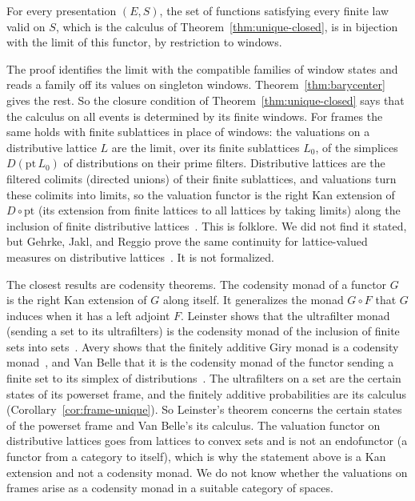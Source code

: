 \begin{theorem}
\label{thm:cat-limit}
For every presentation $(E, S)$, the set of functions satisfying every
finite law valid on $S$, which is the calculus of
Theorem~\ref{thm:unique-closed}, is in bijection with the limit of this
functor, by restriction to windows.
\end{theorem}

\noindent
The proof identifies the limit with the compatible families of window
states and reads a family off its values on singleton windows.
Theorem~\ref{thm:barycenter} gives the rest. So the closure condition
of Theorem~\ref{thm:unique-closed} says that the calculus on all events
is determined by its finite windows. For frames the same holds with
finite sublattices in place of windows: the valuations on a distributive
lattice $L$ are the limit, over its finite sublattices $L_0$, of the
simplices $D(\mathrm{pt}\,L_0)$ of distributions on their prime filters.
Distributive lattices are the filtered colimits (directed unions) of
their finite sublattices, and valuations turn these colimits into
limits, so the valuation functor is the right Kan extension of
$D \circ \mathrm{pt}$ (its extension from finite lattices to all
lattices by taking limits) along the inclusion of finite distributive
lattices~\cite{adamek-rosicky1994}. This is folklore. We did not find it
stated, but Gehrke, Jakl, and Reggio prove the same continuity for
lattice-valued measures on distributive
lattices~\cite{gehrke-jakl-reggio2022}. It is not formalized.

The closest results are codensity theorems. The codensity monad of a
functor $G$ is the right Kan extension of $G$ along itself. It
generalizes the monad $G \circ F$ that $G$ induces when it has a left
adjoint $F$. Leinster shows that the
ultrafilter monad (sending a set to its ultrafilters) is the codensity
monad of the inclusion of finite sets into sets~\cite{leinster2013}. Avery shows that the finitely additive
Giry monad is a codensity monad~\cite{avery2016}, and Van Belle that it
is the codensity monad of the functor sending a finite set to its
simplex of distributions~\cite{vanbelle2022}. The ultrafilters on a set
are the certain states of its powerset frame, and the finitely additive
probabilities are its calculus (Corollary~\ref{cor:frame-unique}). So
Leinster's theorem concerns the certain states of the powerset frame and
Van Belle's its calculus. The valuation functor on distributive lattices
goes from lattices to convex sets and is not an endofunctor (a functor
from a category to itself), which is why
the statement above is a Kan extension and not a codensity monad.
We do not know whether the valuations on frames arise as a codensity
monad in a suitable category of spaces.

